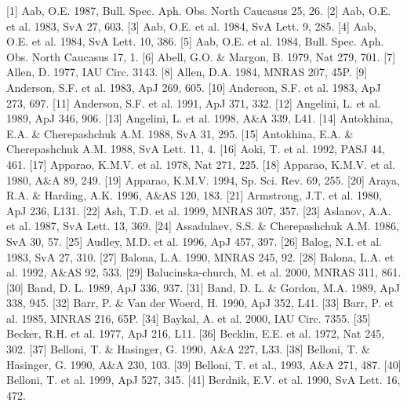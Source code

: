 \documentclass{aa}
\begin{document}
\begin{thebibliography}{}

\bibitem[]{}[1]     Aab, O.E. 1987, Bull. Spec. Aph. Obs. North Caucasus 25, 26.
\bibitem[]{}[2]     Aab, O.E. et al. 1983, SvA 27, 603.
\bibitem[]{}[3]     Aab, O.E. et al. 1984, SvA Lett. 9, 285.
\bibitem[]{}[4]     Aab, O.E. et al. 1984, SvA Lett. 10, 386.
\bibitem[]{}[5]     Aab, O.E. et al. 1984, Bull. Spec. Aph. Obs. North Caucasus 17, 1.
\bibitem[]{}[6]     Abell, G.O. \& Margon, B. 1979, Nat 279, 701.
\bibitem[]{}[7]    Allen, D. 1977, IAU Circ. 3143.
\bibitem[]{}[8]   Allen, D.A. 1984, MNRAS 207, 45P.
\bibitem[]{}[9] Anderson, S.F. et al. 1983, ApJ 269, 605.
\bibitem[]{}[10] Anderson, S.F. et al. 1983, ApJ 273, 697.
\bibitem[]{}[11] Anderson, S.F. et al. 1991, ApJ 371, 332.
\bibitem[]{}[12] Angelini, L. et al. 1989, ApJ 346, 906.
\bibitem[]{}[13] Angelini, L. et al. 1998, A\&A 339, L41.
\bibitem[]{}[14] Antokhina, E.A. \& Cherepashchuk A.M. 1988, SvA 31, 295.
\bibitem[]{}[15] Antokhina, E.A. \& Cherepashchuk A.M. 1988, SvA Lett. 11, 4.
\bibitem[]{}[16] Aoki, T. et al. 1992, PASJ 44, 461.
\bibitem[]{}[17] Apparao, K.M.V. et al. 1978, Nat 271, 225.            
\bibitem[]{}[18] Apparao, K.M.V. et al. 1980, A\&A 89, 249.            
\bibitem[]{}[19] Apparao, K.M.V. 1994, Sp. Sci. Rev. 69, 255.
\bibitem[]{}[20] Araya, R.A. \& Harding, A.K. 1996, A\&AS 120, 183.
\bibitem[]{}[21] Armstrong, J.T. et al. 1980, ApJ 236, L131.
\bibitem[]{}[22] Ash, T.D. et al. 1999, MNRAS 307, 357.
\bibitem[]{}[23] Aslanov, A.A. et al. 1987, SvA Lett. 13, 369.
\bibitem[]{}[24] Assadulaev, S.S. \& Cherepashchuk A.M. 1986, SvA 30, 57.
\bibitem[]{}[25] Audley, M.D. et al. 1996, ApJ 457, 397.
\bibitem[]{}[26] Balog, N.I. et al. 1983, SvA 27, 310.
\bibitem[]{}[27] Balona, L.A. 1990, MNRAS 245, 92.
\bibitem[]{}[28] Balona, L.A. et al. 1992, A\&AS 92, 533.
\bibitem[]{}[29] Balucinska-church, M. et al. 2000, MNRAS 311, 861.
\bibitem[]{}[30] Band, D. L. 1989, ApJ 336, 937.
\bibitem[]{}[31] Band, D. L. \& Gordon, M.A. 1989, ApJ 338, 945.
\bibitem[]{}[32] Barr, P. \& Van der Woerd, H. 1990, ApJ 352, L41.
\bibitem[]{}[33] Barr, P. et al. 1985, MNRAS 216, 65P.
\bibitem[]{}[34] Baykal, A. et al. 2000, IAU Circ. 7355.
\bibitem[]{}[35] Becker, R.H. et al. 1977, ApJ 216, L11.
\bibitem[]{}[36] Becklin, E.E. et al. 1972, Nat 245, 302.
\bibitem[]{}[37] Belloni, T. \& Hasinger, G. 1990, A\&A 227, L33.
\bibitem[]{}[38] Belloni, T. \& Hasinger, G. 1990, A\&A 230, 103.
\bibitem[]{}[39] Belloni, T. et al., 1993, A\&A 271, 487.
\bibitem[]{}[40] Belloni, T. et al. 1999, ApJ 527, 345.
\bibitem[]{}[41] Berdnik, E.V. et al. 1990, SvA Lett. 16, 472.

\end{thebibliography}
\end{document}
